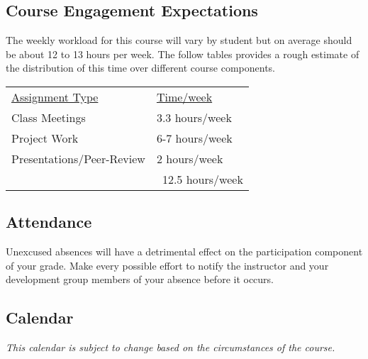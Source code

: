 \documentclass[10pt]{article}
\begin{document}
\subsection{Course Engagement Expectations}

The weekly workload for this course will vary by student but on average should be about 12 to 13 hours per week.  The follow tables provides a rough estimate of the distribution of this time over different course components.
\begin{center}
\begin{tabular}{ll}
\underline{Assignment Type} & \underline{Time/week} \\
Class Meetings       & 3.3 hours/week \\
Project Work          & 6-7 hours/week \\
Presentations/Peer-Review   & 2 hours/week \\
\bottomrule
 & ~12.5 hours/week
\end{tabular}
\end{center}

\subsection{Attendance}

Unexcused absences will have a detrimental effect on the participation component of your grade. Make every possible effort to notify the instructor and your development group members of your absence before it occurs.

\subsection{Calendar}

\textit{This calendar is subject to change based on the circumstances of the course.}
\end{document}
